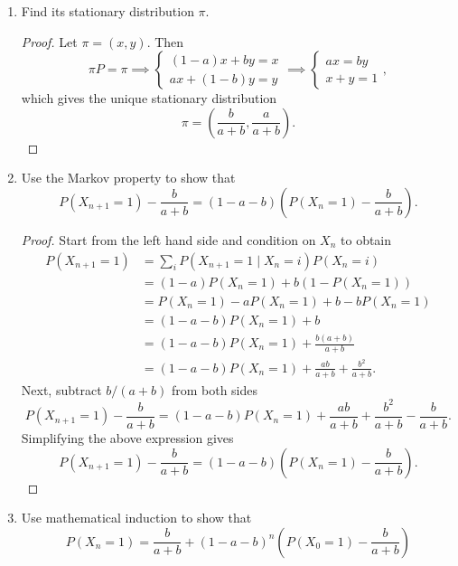 \documentclass[oneside,reqno]{amsart}
\theoremstyle{definition}
\begin{document}
\begin{enumerate}
\item
Find its stationary distribution $\pi$. 
\begin{proof}
Let $\pi = (x,y)$. Then 
\[
	\pi P = \pi 
	\implies 
	\begin{cases}
		(1-a)x + by = x \\
		a x + (1-b)y = y
	\end{cases}
	\implies 
	\begin{cases}
		ax = by \\
		x+y = 1
	\end{cases},
\]
which gives the unique stationary distribution 
\[
	\pi = \left(\frac{b}{a+b},\frac{a}{a+b}\right).
\]
\end{proof}

\item
Use the Markov property to show that 
\[
	P(X_{n+1} = 1) - \frac{b}{a+b} = (1-a-b)\left( P(X_n = 1)- \frac{b}{a+b}\right).
\]

\begin{proof}
Start from the left hand side and condition on $X_n$ to obtain 
\begin{align*}
	P(X_{n+1} = 1) &= \sum_i  P(X_{n+1} = 1 \mid X_n = i) P(X_n = i) \\
						    &= (1-a) P(X_n=1) + b(1-P(X_n=1)) \\
						    &= P(X_n = 1) - aP(X_n=1) + b - bP(X_n=1) \\
						    &= (1-a-b)P(X_n=1) + b \\
						    &= (1-a-b)P(X_n=1) + \frac{b(a+b)}{a+b} \\
						    &= (1-a-b)P(X_n=1) + \frac{ab}{a+b} + \frac{b^2}{a+b}.
\end{align*}
Next, subtract $b/(a+b)$ from both sides 
\[
	P(X_{n+1} = 1) -\frac{b}{a+b} = (1-a-b)P(X_n=1) + \frac{ab}{a+b} + \frac{b^2}{a+b} - \frac{b}{a+b}.
\]
Simplifying the above expression gives
\[
	P(X_{n+1} = 1) - \frac{b}{a+b} = (1-a-b)\left( P(X_n = 1)- \frac{b}{a+b}\right).
\]
\end{proof}

\item
Use mathematical induction to show that 
\[
	P(X_n = 1) = \frac{b}{a+b} + (1-a-b)^n \left( P(X_0 = 1)- \frac{b}{a+b}\right)
\]


\end{enumerate}
\end{document}
